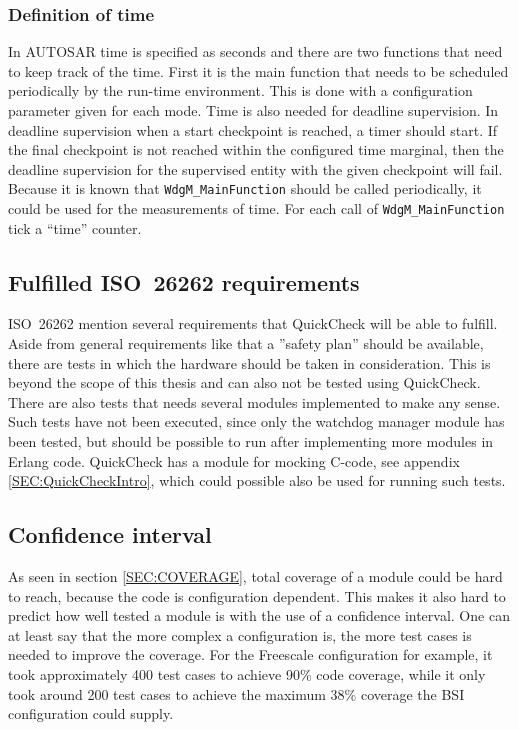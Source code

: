 \subsubsection{Definition of time}
\label{SEC:FUNCTIONAL_SAFETY_TIME}
In AUTOSAR time is specified as seconds and there are two functions that need to
keep track of the time. First it is the main function that needs to be scheduled
periodically by the run-time environment. This is done with a configuration
parameter given for each mode. Time is also needed for deadline supervision. In
deadline supervision when a start checkpoint is reached, a timer should
start. If the final checkpoint is not reached within the configured time
marginal, then the deadline supervision for the supervised entity with the given
checkpoint will fail. Because it is known that \lstinline!WdgM_MainFunction! should
be called periodically, it could be used for the measurements of time. For each
call of \lstinline!WdgM_MainFunction! tick a ``time'' counter.


\subsection{Fulfilled ISO~26262 requirements}
ISO~26262 mention several requirements that QuickCheck will be able to
fulfill. Aside from general requirements like that a ''safety plan'' should be
available, there are tests in which the hardware should be taken in
consideration. This is beyond the scope of this thesis and can also not be
tested using QuickCheck. There are also tests that needs several modules
implemented to make any sense. Such tests have not been executed, since only the
watchdog manager module has been tested, but should be possible to run after
implementing more modules in Erlang code. QuickCheck has a module for
mocking C-code, see appendix \ref{SEC:QuickCheckIntro}, which could
possible also be used for running such tests.

\subsection{Confidence interval}
As seen in section \ref{SEC:COVERAGE}, total coverage of a module
could be hard to reach, because the code is configuration
dependent. This makes it also hard to predict how well tested a module
is with the use of a confidence interval. One can at least say that
the more complex a configuration is, the more test cases is needed to
improve the coverage. For the Freescale configuration for example, it
took approximately 400 test cases to achieve 90\% code coverage, while
it only took around 200 test cases to achieve the maximum 38\%
coverage the BSI configuration could supply.

